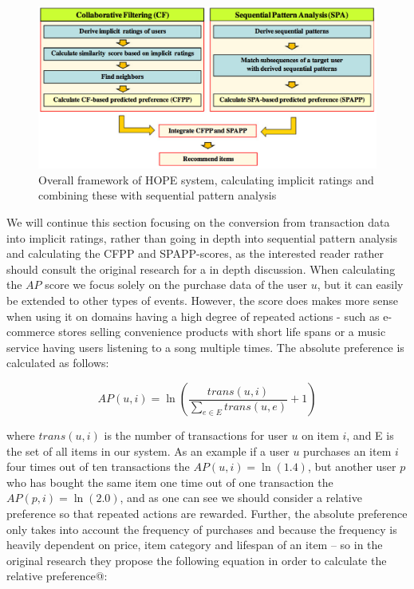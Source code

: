 \begin{figure}[H]
  \centering
  \includegraphics[scale=0.3]{image/hope-system}
  \caption[Overall framework of HOPE system]{Overall framework of HOPE system, calculating implicit ratings and
  combining these with sequential pattern analysis}
  \label{hope-system}
\end{figure}

We will continue this section focusing on the conversion from transaction data
into implicit ratings, rather than going in depth into sequential pattern
analysis and calculating the CFPP and SPAPP-scores, as the interested reader
rather should consult the original research for a in depth discussion. When
calculating the $AP$ score we focus solely on the purchase data of the user
$u$, but it can easily be extended to other types of events. However, the score
does makes more sense when using it on domains having a high degree of repeated
actions - such as e-commerce stores selling convenience products with short
life spans or a music service having users listening to a song multiple times.
The absolute preference is calculated as follows:

\begin{equation}
  AP(u,i) = \ln(\frac{trans(u,i)}{\sum_{e \in E}{trans(u, e)}} + 1)
\end{equation}

where $trans(u,i)$ is the number of transactions for user $u$ on item $i$, and
E is the set of all items in our system. As an example if a user $u$ purchases an
item $i$ four times out of ten transactions the $AP(u,i) = \ln(1.4)$, but another
user $p$ who has bought the same item one time out of one transaction the
$AP(p,i) = \ln(2.0)$, and as one can see we should consider a relative preference so
that repeated actions are rewarded. Further, the absolute preference only takes
into account the frequency of purchases and because the frequency is heavily
dependent on price, item category and lifespan of an item -- so in the original
research they propose the following equation in order to calculate the relative
preference@:

